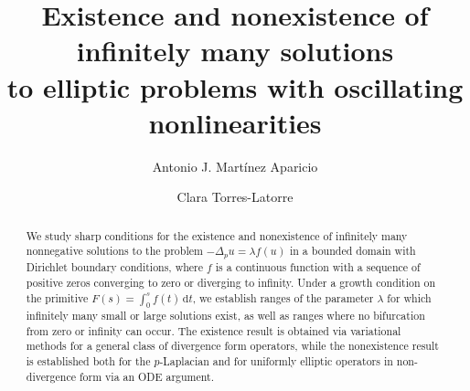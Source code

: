 \documentclass[10pt,twoside,english,reqno,a4paper]{amsart}
\theoremstyle{plain}
\theoremstyle{plain}
\theoremstyle{definition}
\theoremstyle{remark}
\numberwithin{equation}{section}
\begin{document}
\title[Existence and nonexistence of infinitely many solutions to elliptic problems]{Existence and nonexistence of infinitely many solutions\\
to elliptic problems with oscillating nonlinearities}

\author[A. J. Mart\'{i}nez Aparicio]{Antonio J. Mart\'{i}nez Aparicio}
\address[Antonio J. Mart\'{i}nez Aparicio]{Departamento de Matem\'aticas\newline Uni\-ver\-si\-dad de Alme\-r\'ia\newline Ctra. Sacramento s/n\newline
La Ca\~{n}ada de San Urbano - Al\-me\-r\'{\i}a, Spain}

\author[C. Torres-Latorre]{Clara Torres-Latorre}
\address[Clara Torres-Latorre]{Instituto de Ciencias Matemáticas\newline Consejo Superior de Investigaciones Científicas\newline
	C/ Nicolás Cabrera, 13-15 - Madrid, Spain.}

  

\begin{abstract}
We study sharp conditions for the existence and nonexistence of infinitely many
nonnegative solutions to the problem \mbox{$-\Delta_p u = \lambda f(u)$} in a bounded
domain with Dirichlet boundary conditions, where $f$ is a continuous
function with a sequence of positive zeros converging to zero or
diverging to infinity. Under a growth condition on the primitive
$F(s) = \int_0^s f(t)\,\mathrm{d}t$, we establish ranges of
the parameter $\lambda$ for which infinitely many small or large
solutions exist, as well as ranges where no bifurcation from zero
or infinity can occur. The existence result is obtained via
variational methods for a general class of divergence form operators, while the nonexistence result is established both for the $p$-Laplacian and for uniformly elliptic operators in non-divergence form via an ODE argument.
\end{abstract}

\maketitle
\end{document}
